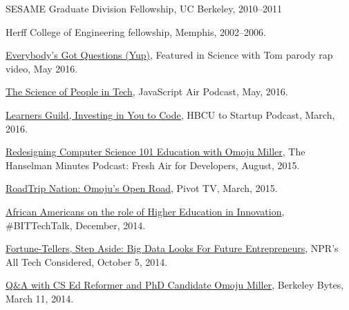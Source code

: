 \documentclass[11pt,article,oneside]{memoir}
\begin{document}
\ind SESAME Graduate Division Fellowship, UC Berkeley, 2010--2011

\ind Herff College of Engineering fellowship, Memphis, 2002--2006.

\bigskip 

\medskip

\ind \href{https://www.youtube.com/watch?v=q5mmE05e82I&ab_channel=ScienceWithTom}{Everybody's Got Questions (Yup)}, Featured in Science with Tom parody rap video, May 2016.

\ind \href{http://audio.javascriptair.com/e/022-jsair-the-science-of-people-in-tech-with-kate-edwards-omoju-miller-and-steve-andrews/}{The Science of People in Tech}, JavaScript Air Podcast, May, 2016.

\ind \href{https://www.youtube.com/watch?v=T0wQRr4RuqM&ab_channel=HBCUtoStartup}{Learners Guild, Investing in You to Code,} HBCU to Startup Podcast, March, 2016.

\ind \href{http://hanselminutes.com/488/redesigning-computer-science-101-education-with-omoju-miller}{Redesigning Computer Science 101 Education with Omoju Miller}, The Hanselman Minutes Podcast: Fresh Air for Developers, August, 2015.

\ind \href{http://roadtripnation.com/leader/omoju-miller}{RoadTrip Nation: Omoju's Open Road}, Pivot TV, March, 2015.

\ind \href{https://www.blacksintechnology.net/the-road-to-50-podcast-african-americans-on-the-role-of-higher-education-in-innovation/}{African Americans on the role of Higher Education in Innovation}, \#BITTechTalk, December, 2014.

\ind \href{http://www.npr.org/sections/alltechconsidered/2014/10/05/351851015/fortune-tellers-step-aside-big-data-looks-for-future-entrepreneurs}{Fortune-Tellers, Step Aside: Big Data Looks For Future Entrepreneurs}, NPR's  All Tech Considered, October 5, 2014.

\ind \href{http://best.berkeley.edu/2015/03/11/best-labber-in-berkeley-byte-qa-with-cs-ed-reformer-and-phd-candidate-omoju-miller/}{Q\&A with CS Ed Reformer and PhD Candidate Omoju Miller}, Berkeley Bytes, March 11, 2014.
\end{document}
